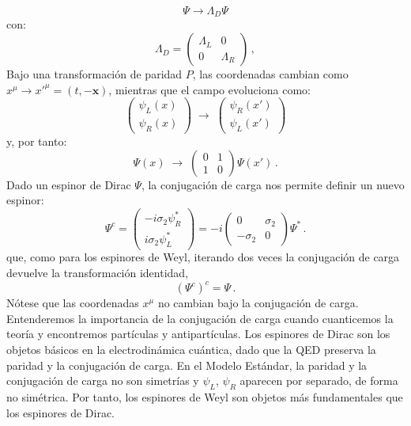 \documentclass[a4paper,11pt]{book} %
\begin{document}
$$\Psi\rightarrow\Lambda_{D}\Psi$$
\noindent
con:
\begin{equation}
\Lambda_{D}=\begin{pmatrix}\Lambda_{L} & 0\\ 0 & \Lambda_{R}\end{pmatrix}\,,
\end{equation}
 \noindent
Bajo una
transformación de paridad $P$, las coordenadas cambian como
$x^{\mu}\rightarrow x'^{\mu}=(t,-\mathbf{x})$, mientras que el campo evoluciona como:
\begin{equation}
\begin{pmatrix}\psi_{L}(x)\\ \psi_{R}(x)\end{pmatrix}
\;\rightarrow\;
\begin{pmatrix}\psi_{R}(x')\\ \psi_{L}(x')\end{pmatrix}
\end{equation}
\noindent
y, por tanto:
\begin{equation}
\Psi(x)\;\rightarrow\;\begin{pmatrix}0 & 1\\ 1 & 0\end{pmatrix}\Psi(x')\,.
\end{equation}
\noindent
Dado un espinor de Dirac $\Psi$, la
conjugación de carga nos permite definir un nuevo espinor:
\begin{equation}
\Psi^{c}=\begin{pmatrix}-i\sigma_{2}\psi^{*}_{R}\\ i\sigma_{2}\psi^{*}_{L}\end{pmatrix}
=-i\begin{pmatrix}0 & \sigma_{2}\\ -\sigma_{2} & 0\end{pmatrix}\Psi^{*}\,.
\end{equation}
\noindent
que, como para los espinores de Weyl, iterando dos veces la conjugación de carga
devuelve la transformación identidad,
\begin{equation}
(\Psi^{c})^{c}=\Psi\,.
\end{equation}
\noindent
Nótese que las coordenadas $x^{\mu}$ no cambian bajo la conjugación de carga.
Entenderemos la importancia de la conjugación de carga cuando cuanticemos la
teoría y encontremos partículas y antipartículas.
\medskip\newline
Los espinores de Dirac son los objetos básicos en la electrodinámica cuántica, dado que la QED preserva la paridad y la conjugación de carga. En el Modelo Estándar, la paridad y la conjugación de
carga no son simetrías y $\psi_{L}$, $\psi_{R}$ aparecen por separado, de forma
no simétrica. Por tanto, los espinores de Weyl son objetos más fundamentales que
los espinores de Dirac.
 
\end{document}

